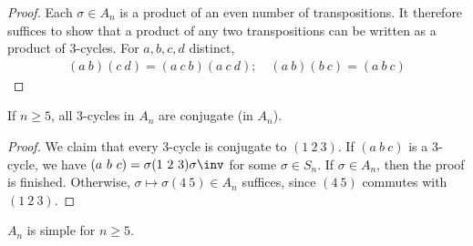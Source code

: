 \begin{proof}
	Each $\sigma \in A_n$ is a product of an even number of transpositions.
	It therefore suffices to show that a product of any two transpositions can be written as a product of 3-cycles.
	For $a, b, c, d$ distinct,
	\begin{align*}
		(a\ b)(c\ d) = (a\ c\ b)(a\ c\ d);\quad (a\ b)(b\ c) = (a\ b\ c)
	\end{align*}
\end{proof}
\begin{lemma}
	If $n \geq 5$, all 3-cycles in $A_n$ are conjugate (in $A_n$).
\end{lemma}
\begin{proof}
	We claim that every 3-cycle is conjugate to $(1\ 2\ 3)$.
	If $(a\ b\ c)$ is a 3-cycle, we have $(a\ b\ c) = \sigma(1\ 2\ 3)\sigma\inv$ for some $\sigma \in S_n$.
	If $\sigma \in A_n$, then the proof is finished.
	Otherwise, $\sigma \mapsto \sigma(4\ 5) \in A_n$ suffices, since $(4\ 5)$ commutes with $(1\ 2\ 3)$.
\end{proof}
\begin{theorem}
	$A_n$ is simple for $n \geq 5$.
\end{theorem}
